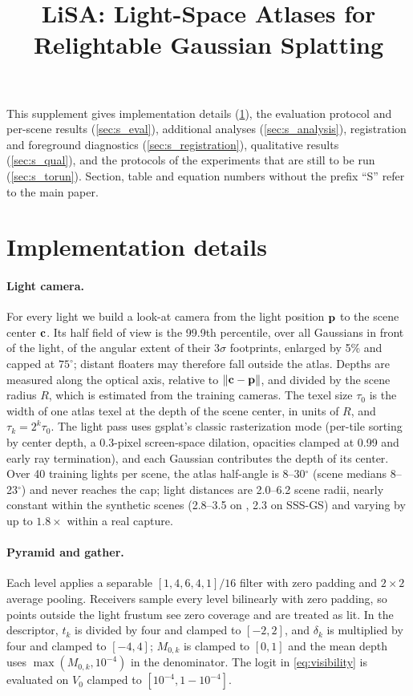 \documentclass[10pt,twocolumn,letterpaper]{article}
\title{LiSA: Light-Space Atlases for Relightable Gaussian Splatting}
\begin{document}
\maketitlesupplementary
\renewcommand{\thesection}{S\arabic{section}}
\renewcommand{\thetable}{S\arabic{table}}
\renewcommand{\thefigure}{S\arabic{figure}}
\renewcommand{\theequation}{S\arabic{equation}}

This supplement gives implementation details (\cref{sec:s_impl}), the evaluation protocol and per-scene results (\cref{sec:s_eval}), additional analyses (\cref{sec:s_analysis}), registration and foreground diagnostics (\cref{sec:s_registration}), qualitative results (\cref{sec:s_qual}), and the protocols of the experiments that are still to be run (\cref{sec:s_torun}).
Section, table and equation numbers without the prefix ``S'' refer to the main paper.

\section{Implementation details}
\label{sec:s_impl}

\paragraph{Light camera.}
For every light we build a look-at camera from the light position $\mathbf{p}$ to the scene center $\mathbf{c}$.
Its half field of view is the 99.9th percentile, over all Gaussians in front of the light, of the angular extent of their $3\sigma$ footprints, enlarged by 5\% and capped at $75^\circ$; distant floaters may therefore fall outside the atlas.
Depths are measured along the optical axis, relative to $\|\mathbf{c}-\mathbf{p}\|$, and divided by the scene radius $R$, which is estimated from the training cameras.
The texel size $\tau_0$ is the width of one atlas texel at the depth of the scene center, in units of $R$, and $\tau_k=2^k\tau_0$.
The light pass uses gsplat's classic rasterization mode (per-tile sorting by center depth, a 0.3-pixel screen-space dilation, opacities clamped at 0.99 and early ray termination), and each Gaussian contributes the depth of its center.
Over 40 training lights per scene, the atlas half-angle is 8--30$^\circ$ (scene medians 8--23$^\circ$) and never reaches the cap; light distances are 2.0--6.2 scene radii, nearly constant within the synthetic scenes (2.8--3.5 on \gsthree, 2.3 on SSS-GS) and varying by up to $1.8\times$ within a real capture.

\paragraph{Pyramid and gather.}
Each level applies a separable $[1,4,6,4,1]/16$ filter with zero padding and $2\times2$ average pooling.
Receivers sample every level bilinearly with zero padding, so points outside the light frustum see zero coverage and are treated as lit.
In the descriptor, $t_k$ is divided by four and clamped to $[-2,2]$, and $\delta_k$ is multiplied by four and clamped to $[-4,4]$; $M_{0,k}$ is clamped to $[0,1]$ and the mean depth uses $\max(M_{0,k},10^{-4})$ in the denominator.
The logit in \cref{eq:visibility} is evaluated on $V_0$ clamped to $[10^{-4},1-10^{-4}]$.
\end{document}
